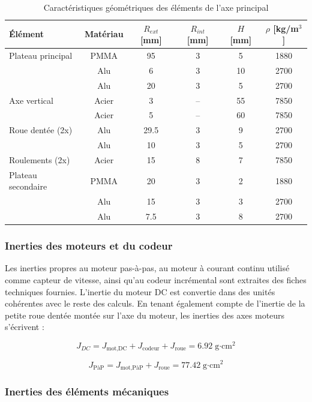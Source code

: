 \begin{table}[h!]
\centering
\begin{tabular}{|l| c| c| c| c| c|}
\hline
Élément & Matériau & $R_{ext}$ [mm] & $R_{int}$ [mm] & $H$ [mm] & $\rho$ [kg/m$^3$] \\
\hline
Plateau principal & PMMA & 95 & 3 & 5 & 1880 \\
 & Alu & 6 & 3 & 10 & 2700 \\
 & Alu & 20 & 3 & 5 & 2700 \\
 \hline
Axe vertical & Acier & 3 & -- & 55 & 7850 \\
 & Acier & 5 & -- & 60 & 7850 \\
 \hline
Roue dentée (2x) & Alu & 29.5 & 3 & 9 & 2700 \\
 & Alu & 10 & 3 & 5 & 2700 \\
 \hline
Roulements (2x) & Acier & 15 & 8 & 7 & 7850 \\
\hline
Plateau secondaire & PMMA & 20 & 3 & 2 & 1880 \\
 & Alu & 15 & 3 & 3 & 2700 \\
 & Alu & 7.5 & 3 & 8 & 2700 \\
\hline
\end{tabular}
\caption{Caractéristiques géométriques des éléments de l’axe principal}
\label{tab :Geometrie_inertie}
\end{table}
\subsubsection{Inerties des moteurs et du codeur}

Les inerties propres au moteur pas-à-pas, au moteur à courant continu utilisé comme capteur de vitesse, ainsi qu’au codeur incrémental sont extraites des fiches techniques fournies. L’inertie du moteur DC est convertie dans des unités cohérentes avec le reste des calculs. En tenant également compte de l’inertie de la petite roue dentée montée sur l’axe du moteur, les inerties des axes moteurs s’écrivent :

\begin{equation}
J_{DC} = J_{\text{mot,DC}} + J_{\text{codeur}} + J_{\text{roue}} = 6.92 \; \text{g·cm}^2
\end{equation}

\begin{equation}
J_{\text{PàP}} = J_{\text{mot,PàP}} + J_{\text{roue}} = 77.42 \; \text{g·cm}^2
\end{equation}

\subsubsection{Inerties des éléments mécaniques}

